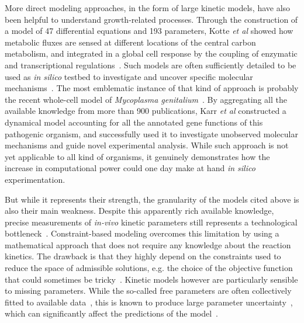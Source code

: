More direct modeling approaches, in the form of large kinetic models, have also been helpful to understand growth-related processes.
Through the construction of a model of 47 differential equations and 193 parameters, Kotte \textit{et al} showed how metabolic fluxes are sensed at different locations of the central carbon metabolism, and integrated in a global cell response by the coupling of enzymatic and transcriptional regulations~\cite{kotte_bacterial_2010}.
Such models are often sufficiently detailed to be used as \textit{in silico} testbed to investigate and uncover specific molecular mechanisms~\cite{peskov_kinetic_2012}.
The most emblematic instance of that kind of approach is probably the recent whole-cell model of \textit{Mycoplasma genitalium}~\cite{karr_whole-cell_2012}.
By aggregating all the available knowledge from more than 900 publications, Karr \textit{et al} constructed a dynamical model accounting for all the annotated gene functions of this pathogenic organism, and successfully used it to investigate unobserved molecular mechanisms and guide novel experimental analysis.
While such approach is not yet applicable to all kind of organisms, it genuinely demonstrates how the increase in computational power could one day make at hand \textit{in silico} experimentation.

But while it represents their strength, the granularity of the models cited above is also their main weakness.
Despite this apparently rich available knowledge, precise measurements of \textit{in-vivo} kinetic parameters still represents a technological bottleneck~\cite{park_metabolite_2016,bennett_absolute_2009,buscher_cross-platform_2009}.
Constraint-based modeling overcomes this limitation by using a mathematical approach that does not require any knowledge about the reaction kinetics.
The drawback is that they highly depend on the constraints used to reduce the space of admissible solutions, e.g. the choice of the objective function that could sometimes be tricky~\cite{kauffman_advances_2003}.
Kinetic models however are particularly sensible to missing parameters.
While the so-called free parameters are often collectively fitted to available data~\cite{jaqaman_linking_2006,mendes_non-linear_1998}, this is known to produce large parameter uncertainty~\cite{cho_experimental_2003,brodersen_characterization_1987,rodriguez-fernandez_hybrid_2006}, which can significantly affect the predictions of the model~\cite{gutenkunst_universally_2007,ingram_network_2006,mayo_plasticity_2006}.

